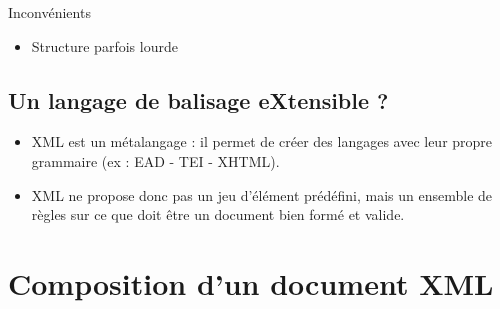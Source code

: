 \documentclass[18pt,a4paper,oneside]{book} %
\begin{document}
Inconvénients
\bigskip 
\begin{itemize}
\item Structure parfois lourde
\end{itemize}



\section{Un langage de balisage eXtensible ?}

\begin{itemize}
\item XML est un métalangage : il permet de créer des langages avec leur propre grammaire (ex : EAD - TEI - XHTML).
\item XML ne propose donc pas un jeu d'élément prédéfini, mais un ensemble de règles sur ce que doit être un document bien formé et valide.
\end{itemize}

\chapter{Composition d'un document XML}
\end{document}
